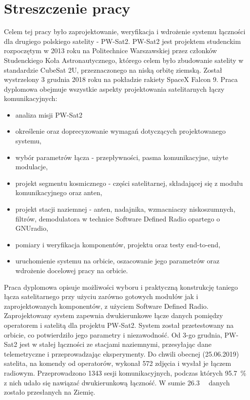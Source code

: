 \chapter{Streszczenie pracy}

Celem tej pracy było zaprojektowanie, weryfikacja i wdrożenie systemu łączności dla drugiego polskiego satelity - PW-Sat2. PW-Sat2 jest projektem studenckim  rozpoczętym w 2013 roku na Politechnice Warszawskiej przez członków Studenckiego Koła Astronautycznego, którego celem było zbudowanie satelity w standardzie CubeSat 2U, przeznaczonego na niską orbitę ziemską. Został wystrzelony 3 grudnia 2018 roku na pokładzie rakiety SpaceX Falcon 9.
Praca dyplomowa obejmuje wszystkie aspekty projektowania satelitarnych łączy komunikacyjnych:
\begin{itemize}
    \setlength\itemsep{0em}
    \item analiza misji PW-Sat2
    \item określenie oraz doprecyzowanie wymagań dotyczących projektowanego systemu,
    \item wybór parametrów łącza - przepływności, pasma komunikacyjne, użyte modulacje,
    \item projekt segmentu kosmicznego - części satelitarnej, składającej się z modułu komunikacyjnego oraz anten,
    \item projekt stacji naziemnej - anten, nadajnika, wzmacniaczy niskoszumnych, filtrów, demodulatora w technice Software Defined Radio opartego o GNUradio,
    \item pomiary i weryfikacja komponentów, projektu oraz testy end-to-end,
    \item uruchomienie systemu na orbicie, oszacowanie jego parametrów oraz wdrożenie docelowej pracy na orbicie.
\end{itemize}
Praca dyplomowa opisuje możliwości wyboru i praktyczną konstrukcję taniego łącza satelitarnego przy użyciu zarówno gotowych modułów jak i zaprojektowanych komponentów, z użyciem Software Defined Radio. Zaprojektowany system zapewnia dwukierunkowe łącze danych pomiędzy operatorem i satelitą dla projektu PW-Sat2. System został przetestowany na orbicie, co potwierdziło jego parametry i niezawodność. Od 3-go grudnia, PW-Sat2 jest w stałej łączności ze stacjami naziemnymi, przesyłając dane telemetryczne i przeprowadzając eksperymenty. Do chwili obecnej (25.06.2019) satelita, na komendy od operatorów, wykonał \si{572} zdjęcia i wysłał je łączem radiowym. Przeprowadzono \si{1343} sesji komunikacyjnych, podczas których \SI{95.7}{\percent} z nich udało się nawiązać dwukierunkową łączność. W sumie \SI{26.3}{\mega\byte} danych zostało przesłanych na Ziemię.

